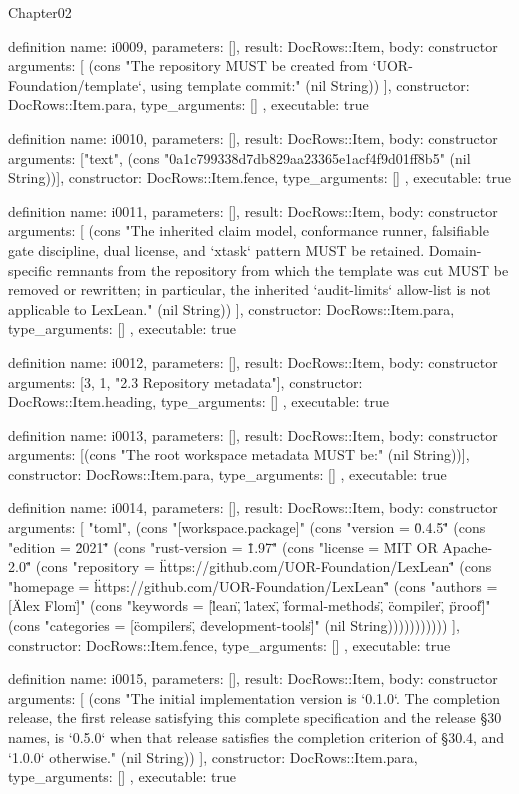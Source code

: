 \begin{lexlean}{Chapter02}
\begin{semanticmodule}
definition{
  name: i0009,
  parameters: [],
  result: DocRows::Item,
  body: constructor{
    arguments: [
      (cons "The repository MUST be created from `UOR-Foundation/template`, using template commit:" (nil String))
    ],
    constructor: DocRows::Item.para,
    type_arguments: []
  },
  executable: true
}

definition{
  name: i0010,
  parameters: [],
  result: DocRows::Item,
  body: constructor{
    arguments: ["text", (cons "0a1c799338d7db829aa23365e1acf4f9d01ff8b5" (nil String))],
    constructor: DocRows::Item.fence,
    type_arguments: []
  },
  executable: true
}

definition{
  name: i0011,
  parameters: [],
  result: DocRows::Item,
  body: constructor{
    arguments: [
      (cons "The inherited claim model, conformance runner, falsifiable gate discipline, dual license, and `xtask` pattern MUST be retained. Domain-specific remnants from the repository from which the template was cut MUST be removed or rewritten; in particular, the inherited `audit-limits` allow-list is not applicable to LexLean." (nil String))
    ],
    constructor: DocRows::Item.para,
    type_arguments: []
  },
  executable: true
}

definition{
  name: i0012,
  parameters: [],
  result: DocRows::Item,
  body: constructor{
    arguments: [3, 1, "2.3 Repository metadata"],
    constructor: DocRows::Item.heading,
    type_arguments: []
  },
  executable: true
}

definition{
  name: i0013,
  parameters: [],
  result: DocRows::Item,
  body: constructor{
    arguments: [(cons "The root workspace metadata MUST be:" (nil String))],
    constructor: DocRows::Item.para,
    type_arguments: []
  },
  executable: true
}

definition{
  name: i0014,
  parameters: [],
  result: DocRows::Item,
  body: constructor{
    arguments: [
      "toml",
      (cons "[workspace.package]" (cons "version = \"0.4.5\"" (cons "edition = \"2021\"" (cons "rust-version = \"1.97\"" (cons "license = \"MIT OR Apache-2.0\"" (cons "repository = \"https://github.com/UOR-Foundation/LexLean\"" (cons "homepage = \"https://github.com/UOR-Foundation/LexLean\"" (cons "authors = [\"Alex Flom\"]" (cons "keywords = [\"lean\", \"latex\", \"formal-methods\", \"compiler\", \"proof\"]" (cons "categories = [\"compilers\", \"development-tools\"]" (nil String)))))))))))
    ],
    constructor: DocRows::Item.fence,
    type_arguments: []
  },
  executable: true
}

definition{
  name: i0015,
  parameters: [],
  result: DocRows::Item,
  body: constructor{
    arguments: [
      (cons "The initial implementation version is `0.1.0`. The completion release, the first release satisfying this complete specification and the release §30 names, is `0.5.0` when that release satisfies the completion criterion of §30.4, and `1.0.0` otherwise." (nil String))
    ],
    constructor: DocRows::Item.para,
    type_arguments: []
  },
  executable: true
}


\end{semanticmodule}
\end{lexlean}
